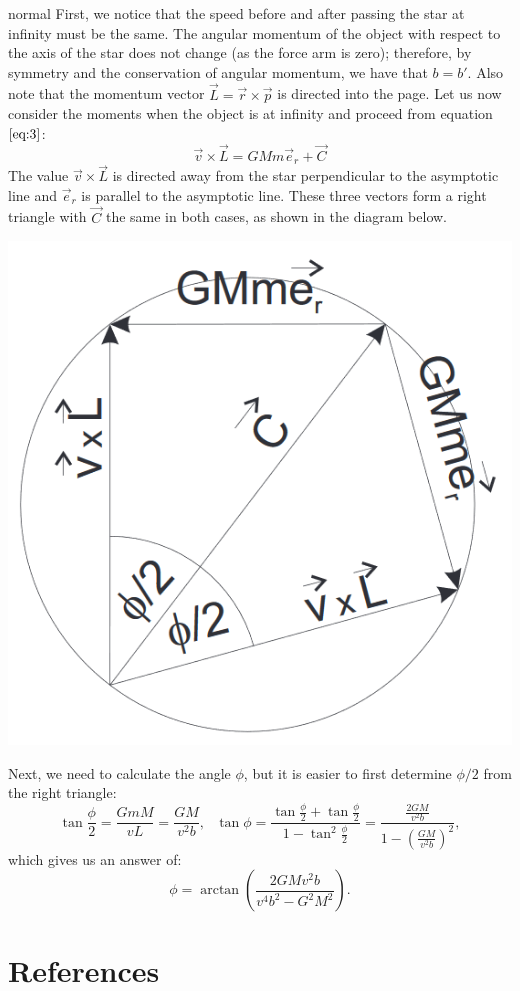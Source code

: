 \documentclass[11pt]{article}
\begin{document}
\begin{answer}{normal} %
First, we notice that the speed before and after passing the star at infinity must be the same. The angular momentum of the object with respect to the axis of the star does not change (as the force arm is zero); therefore, by symmetry and the conservation of angular momentum, we have that $b=b'$. Also note that the momentum vector $\vec{L}=\vec{r}\times\vec{p}$ is directed into the page. Let us now consider the moments when the object is at infinity and proceed from equation $\ref{eq:3}$:
$$\vec{v}\times\vec{L}=GMm\vec{e}_r+\vec{C}$$
The value $\vec{v}\times\vec{L}$ is directed away from the star perpendicular to the asymptotic line and $\vec{e}_r$ is parallel to the asymptotic line. These three vectors form a right triangle with $\vec{C}$ the same in both cases, as shown in the diagram below.
\begin{center}
    \includegraphics[width=0.35\linewidth]{Images/CM7.png}
\end{center}
Next, we need to calculate the angle $\phi$, but it is easier to first determine $\phi/2$ from the right triangle:
 $$\tan{\frac{\phi}{2}} = \frac{GmM}{vL} = \frac{GM}{v^2 b}, \ \ \   \tan{\phi} = \frac{\tan{\frac{\phi}{2}}+\tan{\frac{\phi}{2}}}{1-\tan^2{\frac{\phi}{2}}} = \frac{\tfrac{2GM}{v^2 b}}{1-{\left(\tfrac{GM}{v^2 b}\right)}^2},$$
 which gives us an answer of:
 $$\phi=\arctan\left(\dfrac{2GMv^2b}{v^4b^2-G^2M^2}\right).$$
\end{answer}
\vspace{-0.5cm}
\section{References}
\begin{biblist}
\end{biblist}
\end{document}
